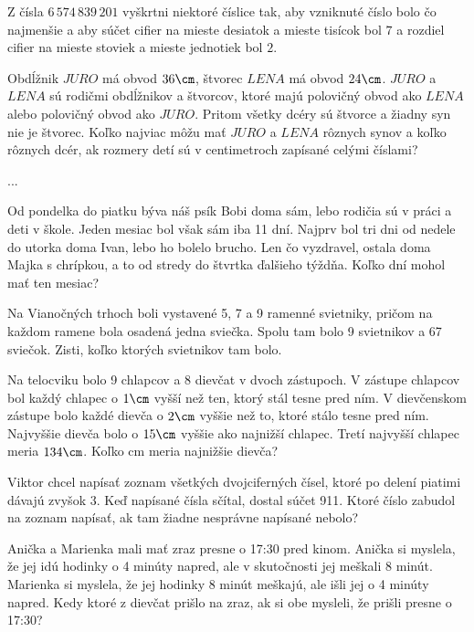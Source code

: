 ﻿{%
Z čísla $6\,574\,839\,201$ vyškrtni niektoré číslice tak, aby vzniknuté číslo bolo čo najmenšie a aby
súčet cifier na mieste desiatok a mieste tisícok bol $7$ a rozdiel cifier na mieste stoviek a mieste
jednotiek bol $2$.}

{%
Obdĺžnik $JURO$ má obvod $36\cm$, štvorec $LENA$ má obvod $24\cm$. $JURO$ a $LENA$ sú rodičmi
obdĺžnikov a štvorcov, ktoré majú polovičný obvod ako $LENA$ alebo polovičný obvod ako
$JURO$. Pritom všetky dcéry sú štvorce a žiadny syn nie je štvorec. Koľko najviac môžu mať
$JURO$ a $LENA$ rôznych synov a koľko rôznych dcér, ak rozmery detí sú v centimetroch
zapísané celými číslami?}

{%
...}

{%
Od pondelka do piatku býva náš psík Bobi doma sám, lebo rodičia sú v práci a deti v škole.
Jeden mesiac bol však sám iba 11 dní. Najprv bol tri dni od nedele do utorka doma Ivan, lebo
ho bolelo brucho. Len čo vyzdravel, ostala doma Majka s chrípkou, a to od stredy do štvrtka
ďalšieho týždňa. Koľko dní mohol mať ten mesiac?}

{%
Na Vianočných trhoch boli vystavené 5, 7 a 9 ramenné svietniky, pričom na každom ramene
bola osadená jedna sviečka. Spolu tam bolo 9 svietnikov a 67 sviečok. Zisti, koľko ktorých
svietnikov tam bolo.}

{%
Na telocviku bolo 9 chlapcov a 8 dievčat v dvoch zástupoch. V zástupe chlapcov bol každý
chlapec o $1\cm$ vyšší než ten, ktorý stál tesne pred ním. V dievčenskom zástupe bolo každé
dievča o $2\cm$ vyššie než to, ktoré stálo tesne pred ním. Najvyššie dievča bolo o $15\cm$ vyššie
ako najnižší chlapec. Tretí najvyšší chlapec meria $134\cm$. Koľko cm meria najnižšie dievča?}

{%
Viktor chcel napísať zoznam všetkých dvojciferných čísel, ktoré po delení piatimi dávajú
zvyšok 3. Keď napísané čísla sčítal, dostal súčet 911. Ktoré číslo zabudol na zoznam napísať,
ak tam žiadne nesprávne napísané nebolo?}

{%
Anička a Marienka mali mať zraz presne o 17:30 pred kinom. Anička si myslela, že jej idú
hodinky o 4 minúty napred, ale v skutočnosti jej meškali 8 minút. Marienka si myslela, že jej
hodinky 8 minút meškajú, ale išli jej o 4 minúty napred. Kedy ktoré z dievčat prišlo na zraz,
ak si obe mysleli, že prišli presne o 17:30?}

